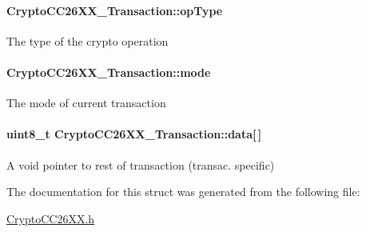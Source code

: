 \paragraph[{op\-Type}]{ Crypto\-C\-C26\-X\-X\-\_\-\-Transaction\-::op\-Type}\label{struct_crypto_c_c26_x_x___transaction_a40fe1424c6534f76622ff56ed4f2ab42}
The type of the crypto operation 
\paragraph[{mode}]{ Crypto\-C\-C26\-X\-X\-\_\-\-Transaction\-::mode}\label{struct_crypto_c_c26_x_x___transaction_afe088678af719e3dc46c3196334b9398}
The mode of current transaction 
\paragraph[{data}]{\setlength{\rightskip}{0pt plus 5cm}uint8\-\_\-t Crypto\-C\-C26\-X\-X\-\_\-\-Transaction\-::data\mbox{[}$\,$\mbox{]}}\label{struct_crypto_c_c26_x_x___transaction_a3eb99656cb17d1c68fc28d42b5b392dd}
A void pointer to rest of transaction (transac. specific) 

The documentation for this struct was generated from the following file\-:\begin{DoxyCompactItemize}
\item 
\hyperlink{_crypto_c_c26_x_x_8h}{Crypto\-C\-C26\-X\-X.\-h}\end{DoxyCompactItemize}
